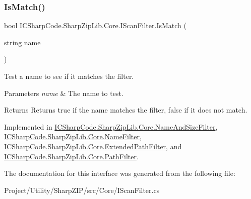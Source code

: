 \subsubsection{\texorpdfstring{Is\+Match()}{IsMatch()}}
{\footnotesize\ttfamily bool I\+C\+Sharp\+Code.\+Sharp\+Zip\+Lib.\+Core.\+I\+Scan\+Filter.\+Is\+Match (\begin{DoxyParamCaption}\item[{string}]{name }\end{DoxyParamCaption})}



Test a name to see if it \textquotesingle{}matches\textquotesingle{} the filter. 


\begin{DoxyParams}{Parameters}
{\em name} & The name to test.\\
\hline
\end{DoxyParams}
\begin{DoxyReturn}{Returns}
Returns true if the name matches the filter, false if it does not match.
\end{DoxyReturn}


Implemented in \hyperlink{class_i_c_sharp_code_1_1_sharp_zip_lib_1_1_core_1_1_name_and_size_filter_a90dcfdf271d08f047b386b8c161b264d}{I\+C\+Sharp\+Code.\+Sharp\+Zip\+Lib.\+Core.\+Name\+And\+Size\+Filter}, \hyperlink{class_i_c_sharp_code_1_1_sharp_zip_lib_1_1_core_1_1_name_filter_a0c289d44f367f90e2369cfb24bd159e1}{I\+C\+Sharp\+Code.\+Sharp\+Zip\+Lib.\+Core.\+Name\+Filter}, \hyperlink{class_i_c_sharp_code_1_1_sharp_zip_lib_1_1_core_1_1_extended_path_filter_a4d66921d72a1b16622a14083b2fb790d}{I\+C\+Sharp\+Code.\+Sharp\+Zip\+Lib.\+Core.\+Extended\+Path\+Filter}, and \hyperlink{class_i_c_sharp_code_1_1_sharp_zip_lib_1_1_core_1_1_path_filter_a9c140b289a97036cdfe4eb55e1b5d5b8}{I\+C\+Sharp\+Code.\+Sharp\+Zip\+Lib.\+Core.\+Path\+Filter}.



The documentation for this interface was generated from the following file\+:\begin{DoxyCompactItemize}
\item 
Project/\+Utility/\+Sharp\+Z\+I\+P/src/\+Core/I\+Scan\+Filter.\+cs\end{DoxyCompactItemize}
